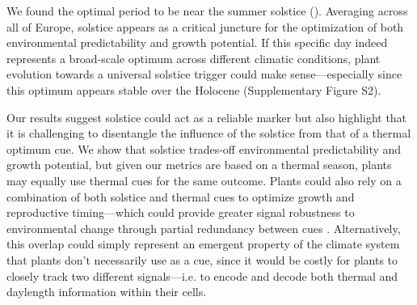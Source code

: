 \documentclass[11pt,letter]{article}
\begin{document}
We found the optimal period to be near the summer solstice (). Averaging across all of Europe, solstice appears as a critical juncture for the optimization of both environmental predictability and growth potential.
If this specific day indeed represents a broad-scale optimum across different climatic conditions, plant evolution towards a universal solstice trigger could make sense---especially since this optimum appears stable over the Holocene (Supplementary Figure S2). %

Our results suggest solstice could act as a reliable marker but also highlight that it is challenging to disentangle the influence of the solstice from that of a thermal optimum cue. %
We show that solstice trades-off environmental predictability and growth potential, but given our metrics are based on a thermal season, plants may equally use thermal cues for the same outcome.
Plants could also rely on a combination of both solstice and thermal cues to optimize growth and reproductive timing---which could provide greater signal robustness to environmental change through partial redundancy between cues \citep{Bonamour2019}.
Alternatively, this overlap could simply represent an emergent property of the climate system that plants don't necessarily use as a cue, since it would be costly for plants to closely track two different signals---i.e. to encode and decode both thermal and daylength information within their cells. 
\end{document}
